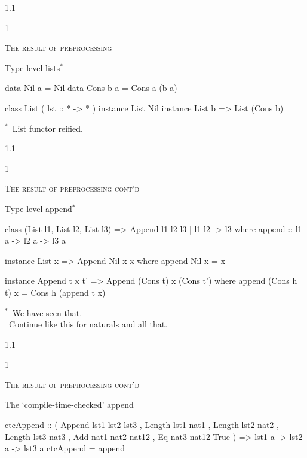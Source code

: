 \documentclass{slides}
\newcommand{\header}[1]{{\large\scshape \color{Red} #1} \medskip }
\newcommand{\blau}[1]{{\color{Blue} #1} \medskip }
\newenvironment{myslide}{\begin{slide}\color{Blue}\begin{boxedminipage}{1.1\hsize}\begin{boxedminipage}{1\hsize}\color{Black}
\vspace{-170\in}
}{%
\smallskip
\end{boxedminipage}
\end{boxedminipage}
\end{slide}}
\begin{document}
\begin{myslide}

\header{The result of preprocessing}

\blau{Type-level lists$^*$}

{\small

\begin{code}
data Nil a    = Nil
data Cons b a = Cons a (b a)
 
class List ( lst :: * -> * )
instance List Nil
instance List b => List (Cons b)
\end{code}

\bigskip

$^*$\ List functor reified.

}

\end{myslide}





\begin{myslide}

\header{The result of preprocessing cont'd}

\blau{Type-level append$^*$}

{\tiny

\begin{code}
class  (List l1, List l2, List l3)
   =>  Append l1 l2 l3 | l1 l2 -> l3
 where append :: l1 a -> l2 a -> l3 a

instance List x => Append Nil x x
 where append Nil x = x

instance Append t x t'
      => Append (Cons t) x (Cons t')
 where   append (Cons h t) x = Cons h (append t x)
\end{code}

\bigskip

$^*$\ We have seen that.\\
\phantom{$^*$}\ Continue like this for naturals and all that.

}

\end{myslide}





\begin{myslide}

\header{The result of preprocessing cont'd}

\blau{The `compile-time-checked' append}

{\tiny

\begin{code}
ctcAppend :: ( Append lst1 lst2 lst3
             , Length lst1 nat1 
             , Length lst2 nat2
             , Length lst3 nat3
             , Add nat1 nat2 nat12
             , Eq nat3 nat12 True
             ) => lst1 a -> lst2 a -> lst3 a
ctcAppend = append
\end{code}

}

\end{myslide}
\end{document}

